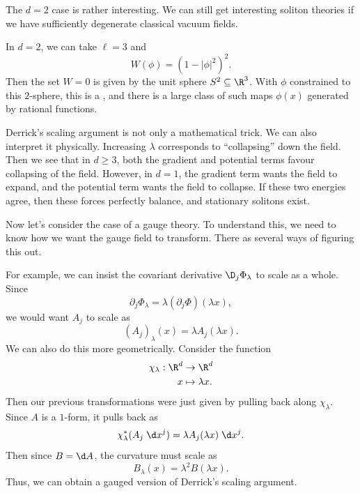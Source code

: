 \documentclass[a4paper]{article}
\begin{document}
The $d = 2$ case is rather interesting. We can still get interesting soliton theories if we have sufficiently degenerate classical vacuum fields.
\begin{eg}
  In $d = 2$, we can take $\ell = 3$ and
  \[
    W(\phi) = (1 - |\phi|^2)^2.
  \]
  Then the set $W = 0$ is given by the unit sphere $S^2 \subseteq \R^3$. With $\phi$ constrained to this $2$-sphere, this is a , and there is a large class of such maps $\phi(x)$ generated by rational functions.
\end{eg}

Derrick's scaling argument is not only a mathematical trick. We can also interpret it physically. Increasing $\lambda$ corresponds to ``collapsing'' down the field. Then we see that in $d \geq 3$, both the gradient and potential terms favour collapsing of the field. However, in $d = 1$, the gradient term wants the field to expand, and the potential term wants the field to collapse. If these two energies agree, then these forces perfectly balance, and stationary solitons exist.

Now let's consider the case of a gauge theory. To understand this, we need to know how we want the gauge field to transform. There as several ways of figuring this out.

For example, we can insist the covariant derivative $\D_j \Phi_\lambda$ to scale as a whole. Since
\[
  \partial_j \Phi_\lambda = \lambda (\partial_j \Phi)(\lambda x),
\]
we would want $A_j$ to scale as
\[
  (A_j)_\lambda(x) = \lambda A_j(\lambda x).
\]
We can also do this more geometrically. Consider the function
\begin{align*}
  \chi_\lambda: \R^d &\to \R^d\\
  x &\mapsto \lambda x.
\end{align*}
Then our previous transformations were just given by pulling back along $\chi_\lambda$. Since $A$ is a $1$-form, it pulls back as
\[
  \chi_\lambda^* (A_j \;\d x^j) = \lambda A_j (\lambda x) \;\d x^j.
\]
Then since $B = \d A$, the curvature must scale as
\[
  B_\lambda(x) = \lambda^2 B(\lambda x).
\]
Thus, we can obtain a gauged version of Derrick's scaling argument.
\end{document}

